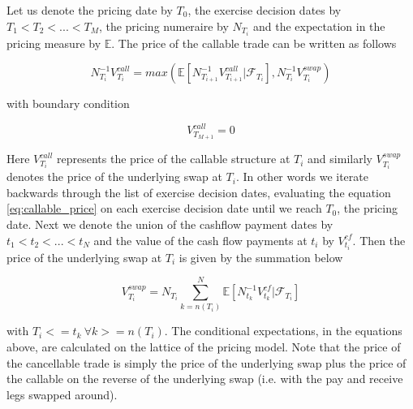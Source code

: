 Let us denote the pricing date by $T_0$, the exercise decision dates
by $T_1 < T_2 < ... < T_M$, the pricing numeraire by $N_{T_{i}}$ and
the expectation in the pricing measure by $\mathbb E$.  The price of
the callable trade can be written as follows

\begin{equation}\label{eq:callable_price}
N_{T_i}^{-1} V^{call}_{T_i} = max(\mathbb E[N_{T_{i+1}}^{-1}V^{call}_{T_{i+1}}| \mathcal F_{T_i}], N_{T_i}^{-1} V^{swap}_{T_i})  
\end{equation}

with boundary condition 

\begin{equation}
V^{call}_{T_{M+1}} = 0
\end{equation}

Here $V^{call}_{T_i}$ represents the price of the callable structure
at $T_i$ and similarly $V^{swap}_{T_i}$ denotes the price of the
underlying swap at $T_i$. In other words we iterate backwards through
the list of exercise decision dates, evaluating the equation
\ref{eq:callable_price} on each exercise decision date until we reach
$T_0$, the pricing date. Next we denote the union of the cashflow
payment dates by $t_1 < t_2 < ... < t_N$ and the value of the cash
flow payments at $t_i$ by $V^{cf}_{t_i}$. Then the price of the
underlying swap at $T_i$ is given by the summation below

\begin{equation}
V^{swap}_{T_i} = N_{T_i} \sum_{k = n(T_i)}^N \mathbb E[N_{t_{k}}^{-1} V^{cf}_{t_k} | \mathcal F_{T_i}]
\end{equation}

with $T_i <= t_k ~\forall k >= n(T_i)$. The conditional expectations,
in the equations above, are calculated on the lattice of the
pricing model. Note that the price of the cancellable trade is simply
the price of the underlying swap plus the price of the callable on the
reverse of the underlying swap (i.e. with the pay and receive legs
swapped around).

